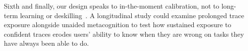 \documentclass[manuscript,review,anonymous]{acmart}
\begin{document}
Sixth and finally, our design speaks to in-the-moment calibration, not to long-term learning or deskilling~\cite{bastani2024generative}. A longitudinal study could examine prolonged trace exposure alongside unaided metacognition to test how sustained exposure to confident traces erodes users' ability to know when they are wrong on tasks they have always been able to do.




\end{document}
